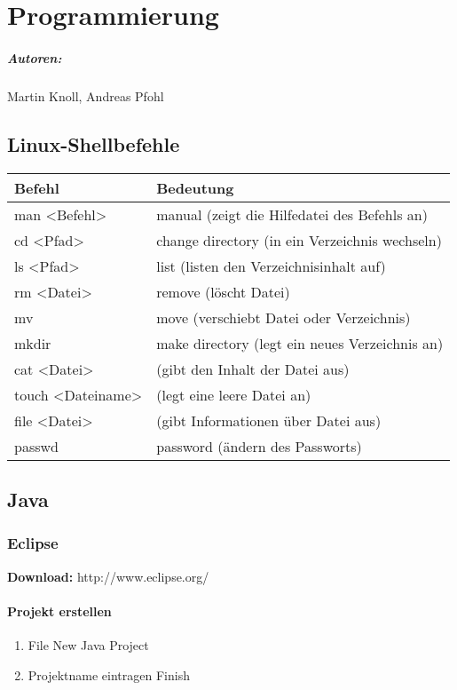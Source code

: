 
\chapter{Programmierung}\label{chap:prog}

\paragraph*{Autoren:} Martin Knoll, Andreas Pfohl

\section{Linux-Shellbefehle}
{
	\begin{tabular}{ll}
	\textbf{Befehl} & \textbf{Bedeutung}\\
	\hline
	man \textless{}Befehl\textgreater{} & manual (zeigt die Hilfedatei des Befehls an)\\
	cd \textless{}Pfad\textgreater{} & change directory (in ein Verzeichnis wechseln)\\
	ls \textless{}Pfad\textgreater{} & list (listen den Verzeichnisinhalt auf)\\
	rm \textless{}Datei\textgreater{} & remove (löscht Datei)\\
	mv & move (verschiebt Datei oder Verzeichnis)\\
	mkdir & make directory (legt ein neues Verzeichnis an)\\
	cat \textless{}Datei\textgreater{} & (gibt den Inhalt der Datei aus)\\
	touch \textless{}Dateiname\textgreater{} & (legt eine leere Datei an)\\
	file \textless{}Datei\textgreater{} & (gibt Informationen über Datei aus)\\
	passwd & password (ändern des Passworts)
	\end{tabular}
}

\section{Java}
	\lstset{language=Java}
	\subsection{Eclipse}
		\textbf{Download:} http://www.eclipse.org/
		\subsubsection{Projekt erstellen}
		\begin{enumerate}
		\item File \frqq New \frqq Java Project
		\item Projektname eintragen \frqq Finish
		\end{enumerate}
		
